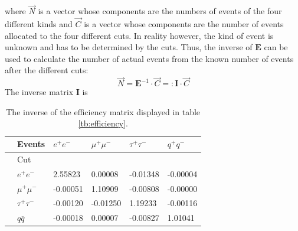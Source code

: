 where $\vec{N}$ is a vector whose components are the numbers of events of the four different kinds and $\vec{C}$ is a vector whose components are the number of events allocated to the four different cuts. 
In reality however, the kind of event is unknown and has to be determined by the cuts. Thus, the inverse of $\boldsymbol{E}$ can be used to calculate the number of actual events from the known number of events after the different cuts:
\begin{equation}
\vec{N}=\boldsymbol{E}^{-1}\cdot\vec{C}=:\boldsymbol{I}\cdot\vec{C}
\label{eq:numberevents}
\end{equation} 
The inverse matrix $\boldsymbol{I}$ is
\begin{table}[H]\centering
	\begin{tabular}{@{}llllll@{}}
		\toprule
		&Events &$e^+e^-$&$\mu^+\mu^-$&$\tau^+\tau^-$&$q^+q^-$\\
		\midrule
		&Cut&&&&\\
		&$e^+e^-$&2.55823&0.00008&-0.01348&-0.00004\\
		&$\mu^+\mu^-$&-0.00051&1.10909&-0.00808&-0.00000\\
		&$\tau^+\tau^-$&-0.00120&-0.01250&1.19233&-0.00116\\
		&$q\overline{q}$&-0.00018&0.00007&-0.00827&1.01041\\
		\bottomrule
	\end{tabular}
	\caption[Inverse efficiency matrix]{The inverse of the efficiency matrix displayed in table \ref{tb:efficiency}.}
	\label{tb:invefficiency}
\end{table}

